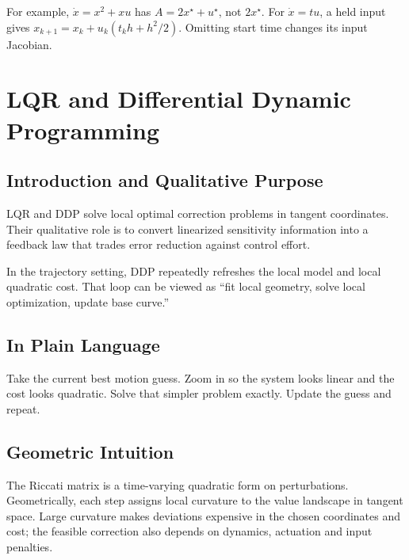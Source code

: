 \documentclass[11pt,letterpaper]{article}
\begin{document}
For example, $\dot x=x^2+xu$ has $A=2x^\star+u^\star$, not $2x^\star$. For $\dot x=tu$, a held input gives $x_{k+1}=x_k+u_k(t_kh+h^2/2)$. Omitting start time changes its input Jacobian.

\section{LQR and Differential Dynamic Programming}

\subsection{Introduction and Qualitative Purpose}
LQR and DDP solve local optimal correction problems in tangent coordinates. Their qualitative role is to convert linearized sensitivity information into a feedback law that trades error reduction against control effort.

In the trajectory setting, DDP repeatedly refreshes the local model and local quadratic cost. That loop can be viewed as ``fit local geometry, solve local optimization, update base curve.''

\subsection{In Plain Language}
Take the current best motion guess. Zoom in so the system looks linear and the cost looks quadratic. Solve that simpler problem exactly. Update the guess and repeat.

\subsection{Geometric Intuition}
The Riccati matrix is a time-varying quadratic form on perturbations. Geometrically, each step assigns local curvature to the value landscape in tangent space. Large curvature makes deviations expensive in the chosen coordinates and cost; the feasible correction also depends on dynamics, actuation and input penalties.
\end{document}

